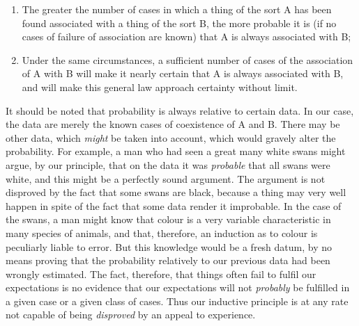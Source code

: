 \documentclass[oneside,letterpaper,12pt]{book}
\begin{document}
\begin{enumerate}[label={(\emph{\alph*})}]
	\item The greater the number of cases in which a thing of the sort A has
	been found associated with a thing of the sort B, the more probable it
	is (if no cases of failure of association are known) that A is always
	associated with B;
	\item Under the same circumstances, a sufficient number of cases of the
	association of A with B will make it nearly certain that A is always
	associated with B, and will make this general law approach certainty
	without limit.
\end{enumerate}
It should be noted that probability is always relative to certain data.
In our case, the data are merely the known cases of coexistence of A and
B. There may be other data, which \emph{might} be taken into account,
which would gravely alter the probability. For example, a man who had
seen a great many white swans might argue, by our principle, that on the
data it was \emph{probable} that all swans were white, and this might be
a perfectly sound argument. The argument is not disproved by the fact
that some swans are black, because a thing may very well happen in spite
of the fact that some data render it improbable. In the case of the
swans, a man might know that colour is a very variable characteristic in
many species of animals, and that, therefore, an induction as to colour
is peculiarly liable to error. But this knowledge would be a fresh
datum, by no means proving that the probability relatively to our
previous data had been wrongly estimated. The fact, therefore, that
things often fail to fulfil our expectations is no evidence that our
expectations will not \emph{probably} be fulfilled in a given case or a
given class of cases. Thus our inductive principle is at any rate not
capable of being \emph{disproved} by an appeal to experience.
\end{document}
